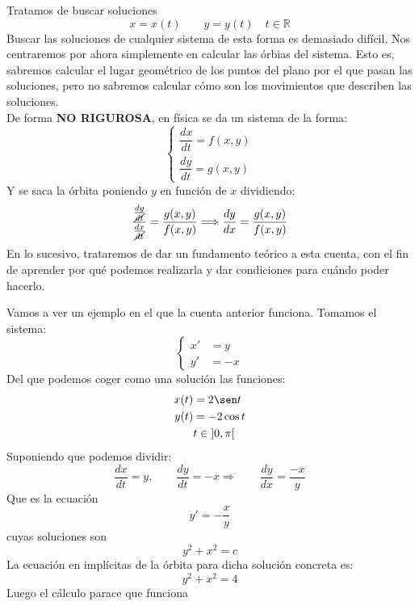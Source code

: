 Tratamos de buscar soluciones
\begin{equation*}
    x=x(t) \qquad y=y(t) \quad t\in \mathbb{R}
\end{equation*}
Buscar las soluciones de cualquier sistema de esta forma es demasiado difícil. Nos centraremos por ahora simplemente en calcular las órbias del sistema. Esto es, sabremos calcular el lugar geométrico de los puntos del plano por el que pasan las soluciones, pero no sabremos calcular cómo son los movimientos que describen las soluciones.\\

\noindent
De forma \textbf{NO RIGUROSA}, en física se da un sistema de la forma:
\begin{equation*}
    \left\{\begin{array}{c}
        \dfrac{dx}{dt} = f(x,y) \\
        \dfrac{dy}{dt} = g(x,y)
    \end{array}\right.
\end{equation*}
Y se saca la órbita poniendo $y$ en función de $x$ dividiendo:
\begin{equation*}
    \dfrac{\frac{dy}{\cancel{dt}}}{\frac{dx}{\cancel{dt}}} = \dfrac{g(x,y)}{f(x,y)} \Longrightarrow \dfrac{dy}{dx} = \dfrac{g(x,y)}{f(x,y)}
\end{equation*}
En lo sucesivo, trataremos de dar un fundamento teórico a esta cuenta, con el fin de aprender por qué podemos realizarla y dar condiciones para cuándo poder hacerlo.

\begin{ejemplo}
    Vamos a ver un ejemplo en el que la cuenta anterior funciona. Tomamos el sistema:
    \begin{equation*}
        \left\{\begin{array}{lr}
                x' &= y \\
                y' &= -x
        \end{array}\right.
    \end{equation*}
    Del que podemos coger como una solución las funciones:
    \begin{align*}
        x(t) &= 2\sen t \\
        y(t) &= -2\cos t \\
             & t\in \left]0,\pi\right[
    \end{align*}
    Suponiendo que podemos dividir:
    \begin{equation*}
        \dfrac{dx}{dt} = y,\qquad \dfrac{dy}{dt} = -x\Longrightarrow  \qquad \dfrac{dy}{dx} = \dfrac{-x}{y}
    \end{equation*}
    Que es la ecuación
    \begin{equation*}
        y' = -\dfrac{x}{y}
    \end{equation*}
    cuyas soluciones son
    \begin{equation*}
        y^2 + x^2 = c
    \end{equation*}
    La ecuación en implícitas de la órbita para dicha solución concreta es:
    \begin{equation*}
        y^2 + x^2 = 4
    \end{equation*}
    Luego el cálculo parace que funciona
\end{ejemplo}

